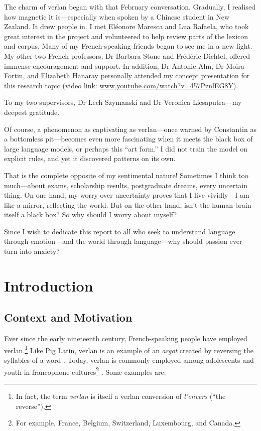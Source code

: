 \documentclass[12pt]{article}
\begin{document}
The charm of verlan began with that February conversation. Gradually, I realised how magnetic it is\;---\;especially when spoken by a Chinese student in New Zealand. It drew people in. I met Eléonore Maresca and Lua Rafaela, who took great interest in the project and volunteered to help review parts of the lexicon and corpus. Many of my French-speaking friends began to see me in a new light. My other two French professors, Dr Barbara Stone and Frédéric Dichtel, offered immense encouragement and support. In addition, Dr Antonie Alm, Dr Moira Fortin, and Elizabeth Hanaray personally attended my concept presentation for this research topic (video link: \url{www.youtube.com/watch?v=457PznlEG8Y}).

To my two supervisors, Dr Lech Szymanski and Dr Veronica Liesaputra\;---\;my deepest gratitude.

Of course, a phenomenon as captivating as verlan\;---\;once warned by Constantin as a bottomless pit\;---\;becomes even more fascinating when it meets the black box of large language models, or perhaps this ``art form.'' I did not train the model on explicit rules, and yet it discovered patterns on its own.

That is the complete opposite of my sentimental nature!
Sometimes I think too much\;---\;about exams, scholarship results, postgraduate dreams, every uncertain thing. On one hand, my worry over uncertainty proves that I live vividly\;---\;I am like a mirror, reflecting the world. But on the other hand, isn't the human brain itself a black box?
So why should I worry about myself?

Since I wish to dedicate this report to all who seek to understand language through emotion\;---\;and the world through language\;---\;why should passion ever turn into anxiety?



\newpage
\section{Introduction}
\subsection{Context and Motivation}

Ever since the early nineteenth century, French-speaking people have employed verlan.\footnote{In fact, the term \textit{verlan} is itself a verlan conversion of \textit{l'envers} (``the reverse'').} 
Like Pig Latin, verlan is an example of an \textit{argot} created by reversing the syllables of a word \cite{rajabov2025,bach2018}. Today, verlan is commonly employed among adolescents and youth in francophone cultures\footnote{For example, France, Belgium, Switzerland, Luxembourg, and Canada.} \cite{evolutionverlan}. Some examples are:
\end{document}
